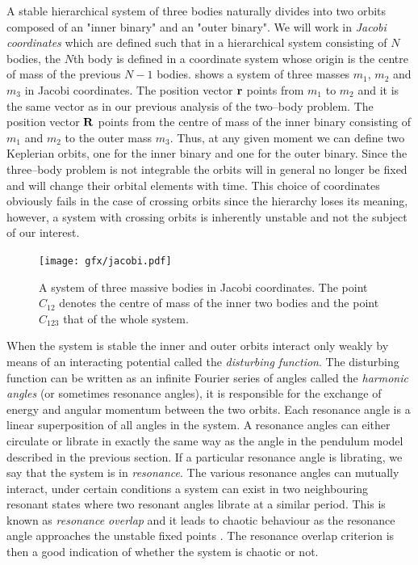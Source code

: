 \documentclass[twoside,openright,titlepage,numbers=noenddot,headinclude,%
                footinclude=true,cleardoublepage=empty,abstractoff, 
                BCOR=5mm,paper=a4,fontsize=11pt,%
                american,%
                ]{scrreprt}%
\begin{document}
A stable hierarchical system of three bodies naturally divides into
two orbits composed of an "inner binary" and an "outer binary". We will work
in \emph{Jacobi coordinates} which are defined such that in a hierarchical
system consisting of $N$ bodies, the $N$th body is defined in a coordinate 
system whose origin is the centre of mass of the previous $N-1$ bodies. 
 shows a system of three masses $m_1$, $m_2$ and $m_3$ in
Jacobi coordinates. The position vector $\boldsymbol{\mathbf{r}}$ points from $m_1$ to $m_2$ 
and it is the same vector as in our previous analysis of the two--body 
problem. The position vector $\boldsymbol{\mathbf{R}}$ points from the centre of mass
of the inner binary consisting of $m_1$ and $m_2$ to the outer mass $m_3$.
Thus, at any given moment we can define two Keplerian orbits, one for
the inner binary and one for the outer binary. Since the three--body
problem is not integrable the orbits will in general no longer be fixed
and will change their orbital elements with time. This choice of coordinates
obviously fails in the case of crossing orbits since the hierarchy loses
its meaning, however, a system with crossing orbits is inherently unstable
and not the subject of our interest.
\begin{figure}[htb]
\centering
\texttt{[image: gfx/jacobi.pdf]}
    \caption[Jacobi coordinates.]{A system of three massive 
    bodies in Jacobi coordinates. 
    The point $C_{12}$ denotes the centre of mass of the inner two 
    bodies and the point $C_{123}$ that of the whole system.}
\label{fig:jacobi}
\end{figure}

When the system is stable the inner and outer orbits interact only 
weakly by means of an interacting potential called the 
\emph{disturbing function}. The disturbing function can be written
as an infinite Fourier series of angles called the \emph{harmonic
angles} (or sometimes resonance angles), it is responsible 
for the exchange of energy and angular 
momentum between the two orbits.  Each resonance angle is a linear
superposition of all angles in the system. A resonance angles can either 
circulate or librate in exactly the same way as the angle in the pendulum model
described in the previous section.
If a particular resonance angle is librating, we say that the system
is in \emph{resonance}. The various resonance angles can mutually 
interact, under certain conditions a system can exist in two 
neighbouring resonant states where two resonant angles librate 
at a similar period. This is known as \emph{resonance overlap} 
and it leads to chaotic behaviour as the resonance angle approaches
the unstable fixed points \citep{WalkerFord1969}. The resonance
overlap criterion is then a good indication of whether the
system is chaotic or not.
\end{document}
